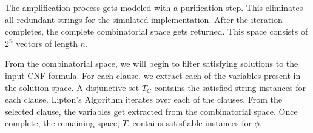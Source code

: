The amplification process gets modeled with a purification step.  This eliminates all redundant strings for the simulated implementation.  After the iteration completes, the complete combinatorial space gets returned. This space consists of $2^n$ vectors of length $n$. 

From the combinatorial space, we will begin to filter satisfying solutions to the input CNF formula.  For each clause, we extract each of the variables present in the solution space.  A disjunctive set $T_C$ contains the satisfied string instances for each clause.  {\sc Lipton's Algorithm} iterates over each of the clauses.  From the selected clause, the variables get extracted from the combinatorial space.  Once complete, the remaining space, $T$, contains satisfiable instances for $\phi$.
%
%
%
%
%
%
%
	
